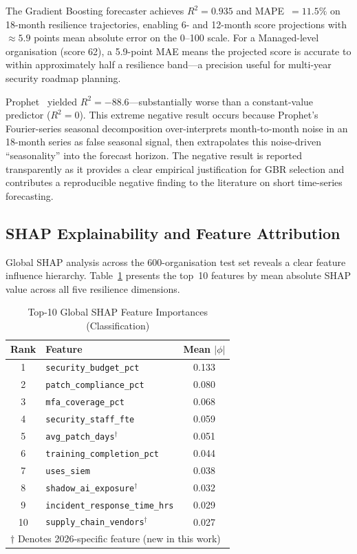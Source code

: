 \documentclass[journal]{IEEEtran}
\begin{document}
The Gradient Boosting forecaster achieves $R^2 = 0.935$ and MAPE~$= 11.5\%$
on 18-month resilience trajectories, enabling 6- and 12-month score
projections with~$\approx 5.9$ points mean absolute error on the 0--100 scale.
For a Managed-level organisation (score 62), a 5.9-point MAE means the
projected score is accurate to within approximately half a resilience band---a
precision useful for multi-year security roadmap planning.

Prophet~\cite{taylor2018prophet} yielded $R^2 = -88.6$---substantially worse
than a constant-value predictor ($R^2 = 0$). This extreme negative result
occurs because Prophet's Fourier-series seasonal decomposition
over-interprets month-to-month noise in an 18-month series as false seasonal
signal, then extrapolates this noise-driven ``seasonality'' into the forecast
horizon. The negative result is reported transparently as it provides a clear
empirical justification for GBR selection and contributes a reproducible
negative finding to the literature on short time-series forecasting.

\subsection{SHAP Explainability and Feature Attribution}

Global SHAP analysis across the 600-organisation test set reveals a clear
feature influence hierarchy. Table~\ref{tab:shap} presents the top~10
features by mean absolute SHAP value across all five resilience dimensions.

\begin{table}[!t]
\renewcommand{\arraystretch}{1.3}
\caption{Top-10 Global SHAP Feature Importances (Classification)}
\label{tab:shap}
\centering
\begin{tabular}{clc}
\toprule
\textbf{Rank} & \textbf{Feature} & \textbf{Mean $|\phi|$} \\
\midrule
1  & \texttt{security\_budget\_pct}      & 0.133 \\
2  & \texttt{patch\_compliance\_pct}     & 0.080 \\
3  & \texttt{mfa\_coverage\_pct}         & 0.068 \\
4  & \texttt{security\_staff\_fte}       & 0.059 \\
5  & \texttt{avg\_patch\_days}$^\dagger$ & 0.051 \\
6  & \texttt{training\_completion\_pct}  & 0.044 \\
7  & \texttt{uses\_siem}                 & 0.038 \\
8  & \texttt{shadow\_ai\_exposure}$^\dagger$ & 0.032 \\
9  & \texttt{incident\_response\_time\_hrs} & 0.029 \\
10 & \texttt{supply\_chain\_vendors}$^\dagger$ & 0.027 \\
\midrule
\multicolumn{3}{l}{\footnotesize $\dagger$ Denotes 2026-specific feature (new in this work)}
\end{tabular}
\end{table}
\end{document}
